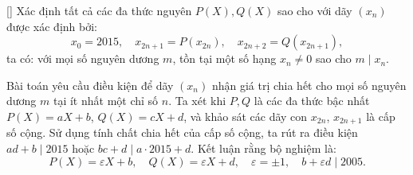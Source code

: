 \documentclass[../07-integer-polynomials.tex]{subfiles}
\begin{document}
\begin{example*}\label{example:FRA-2015-TST2-P4}[\textbf{}]
	Xác định tất cả các đa thức nguyên \( P(X), Q(X) \) sao cho với dãy \( (x_n) \) được xác định bởi:
	\[
		x_0 = 2015,\quad x_{2n+1} = P(x_{2n}),\quad x_{2n+2} = Q(x_{2n+1}),
	\]
	ta có: với mọi số nguyên dương \( m \), tồn tại một số hạng \( x_n \ne 0 \) sao cho \( m \mid x_n \).
\end{example*}

\begin{story*}
	Bài toán yêu cầu điều kiện để dãy \( (x_n) \) nhận giá trị chia hết cho mọi số nguyên dương \( m \) tại ít nhất một chỉ số \( n \).
	Ta xét khi \( P, Q \) là các đa thức bậc nhất \( P(X) = aX + b \), \( Q(X) = cX + d \), và khảo sát các dãy con \( x_{2n} \), \( x_{2n+1} \) là cấp số cộng.
	Sử dụng tính chất chia hết của cấp số cộng, ta rút ra điều kiện \( ad + b \mid 2015 \) hoặc \( bc + d \mid a \cdot 2015 + d \).
	Kết luận rằng bộ nghiệm là:
	\[
		P(X) = \varepsilon X + b,\quad Q(X) = \varepsilon X + d,\quad \varepsilon = \pm 1,\quad b + \varepsilon d \mid 2005.
	\]
\end{story*}

\bigbreak
\end{document}
